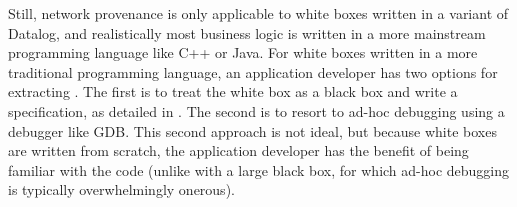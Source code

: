 Still, network provenance is only applicable to white boxes written in a
variant of Datalog, and realistically most business logic is written in a more
mainstream programming language like C++ or Java. For white boxes written in a
more traditional programming language, an application developer has two options
for extracting \watprovenance{}. The first is to treat the white box as a black
box and write a \watprovenance{} specification, as detailed in
. The second is to resort to ad-hoc debugging using a
debugger like GDB. This second approach is not ideal, but because white boxes
are written from scratch, the application developer has the benefit of being
familiar with the code (unlike with a large black box, for which ad-hoc
debugging is typically overwhelmingly onerous).
